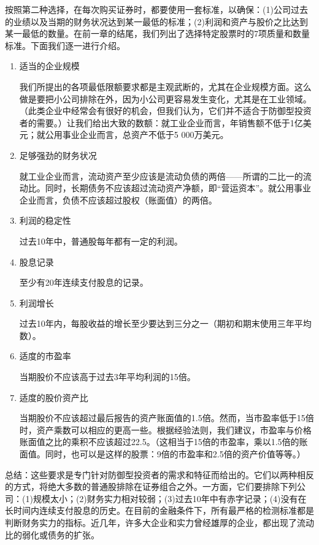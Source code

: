 \documentclass[12pt,oneside]{book}
\begin{document}
按照第二种选择，在每次购买证券时，都要使用一套标准，以确保：(1)公司过去的业绩以及当期的财务状况达到某一最低的标准；(2)利润和资产与股价之比达到某一最低的数量。在前一章的结尾，我们列出了选择特定股票时的7项质量和数量标准。下面我们逐一进行介绍。

\begin{enumerate}
\item 适当的企业规模

我们所提出的各项最低限额要求都是主观武断的，尤其在企业规模方面。这么做是要把小公司排除在外，因为小公司更容易发生变化，尤其是在工业领域。（此类企业中经常会有很好的机会，但我们认为，它们并不适合于防御型投资者的需要。）让我们给出大致的数额：就工业企业而言，年销售额不低于1亿美元；就公用事业企业而言，总资产不低于5 000万美元。
\item 足够强劲的财务状况

就工业企业而言，流动资产至少应该是流动负债的两倍——所谓的二比一的流动比。同时，长期债务不应该超过流动资产净额，即“营运资本”。就公用事业企业而言，负债不应该超过股权（账面值）的两倍。
\item 利润的稳定性

过去10年中，普通股每年都有一定的利润。


\item 股息记录

至少有20年连续支付股息的记录。

\item 利润增长

过去10年内，每股收益的增长至少要达到三分之一（期初和期末使用三年平均数）。
\item 适度的市盈率

当期股价不应该高于过去3年平均利润的15倍。
\item 适度的股价资产比

当期股价不应该超过最后报告的资产账面值的1.5倍。然而，当市盈率低于15倍时，资产乘数可以相应的更高一些。根据经验法则，我们建议，市盈率与价格账面值之比的乘积不应该超过22.5。（这相当于15倍的市盈率，乘以1.5倍的账面值。同时，也可以是这样的股票：9倍的市盈率和2.5倍的资产价值等等。）


\end{enumerate}



总结：这些要求是专门针对防御型投资者的需求和特征而给出的。它们以两种相反的方式，将绝大多数的普通股排除在证券组合之外。一方面，它们要排除下列公司：(1)规模太小；(2)财务实力相对较弱；(3)过去10年中有赤字记录；(4)没有在长时间内连续支付股息的历史。在目前的金融条件下，所有最严格的检测标准都是判断财务实力的指标。近几年，许多大企业和实力曾经雄厚的企业，都出现了流动比的弱化或债务的扩张。
\end{document}
